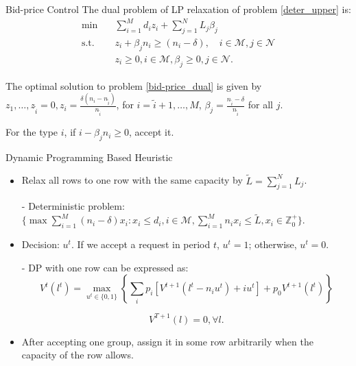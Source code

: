       \begin{frame}{Bid-price Control}
        The dual problem of LP relaxation of problem \eqref{deter_upper} is:
        \begin{equation}\label{bid-price_dual}
          \begin{aligned}
          \min \quad & \sum_{i=1}^{M} d_i z_i + \sum_{j= 1}^{N} L_j \beta_{j} \\
          \text {s.t.} \quad & z_{i} + \beta_j n_i \geq (n_i-\delta), \quad i \in \mathcal{M}, j \in \mathcal{N} \\
          & z_{i} \geq 0, i \in \mathcal{M}, \beta_{j} \geq 0, j \in \mathcal{N}.
          \end{aligned}
        \end{equation}
        
        \small
        
        The optimal solution to problem \eqref{bid-price_dual} is given by $z_1, \ldots, z_{\tilde{i}} =0, z_i = \frac{\delta (n_i - n_{\tilde{i}})}{n_{\tilde{i}}}$, for $i = \tilde{i} + 1, \ldots, M$, $\beta_j = \frac{n_{\tilde{i}} - \delta}{n_{\tilde{i}}}$ for all $j$.
        \vspace{0.5cm}

        For the type $i$, if $i - \beta_j n_i \geq 0$, accept it. 
      \end{frame}

      \begin{frame}{Dynamic Programming Based Heuristic}
        \begin{itemize}
        \item Relax all rows to one row with the same capacity by $\tilde{L} = \sum_{j=1}^{N} L_j$.
        \item[-] Deterministic problem: $\{\max \sum_{i=1}^{M} (n_i- \delta) x_{i}: x_{i} \leq d_{i}, i \in \mathcal{M}, \sum_{i=1}^{M} n_{i} x_{i} \leq \tilde{L}, x_{i} \in \mathbb{Z}^{+}_{0}\}$.
        \item Decision: $u^{t}$. If we accept a request in period $t$, $u^t = 1$; otherwise, $u^t =0$.  
        \item[-] DP with one row can be expressed as:
        $$V^{t}(l^{t}) =  \max_{u^{t} \in \{0,1\}} \left\{ \sum_{i} p_i [V^{t+1}(l^{t}-n_i u^{t})+ i u^{t}] + p_0 V^{t+1}(l^{t})\right\}$$

        $$V^{T+1}(l) =0, \forall l.$$
        \item After accepting one group, assign it in some row arbitrarily when the capacity of the row allows.
        \end{itemize}
      \end{frame}
      
